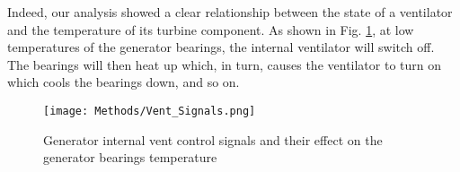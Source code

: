     Indeed, our analysis showed a clear relationship between the state of a ventilator and the temperature of its turbine component.
    As shown in Fig. \ref{fig:vent}, at low temperatures of the generator bearings, the internal ventilator will switch off. The bearings will then heat up which, in turn, causes
    the ventilator to turn on which cools the bearings down, and so on.

    \begin{figure}[H]
      \begin{center}
        \texttt{[image: Methods/Vent\_Signals.png]}
      \end{center}
      \caption{Generator internal vent control signals and their effect on the generator bearings temperature}
      \label{fig:vent}
    \end{figure}

